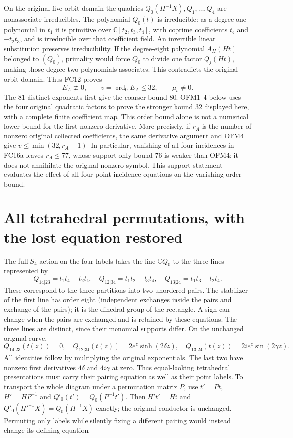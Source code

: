 \documentclass[11pt]{article}
\newcommand{\C}{\mathbb C}
\newcommand{\ord}{\operatorname{ord}}
\begin{document}
On the original five-orbit domain the quadrics $Q_0(H^{-1}X),Q_1,\ldots,Q_4$
are nonassociate irreducibles. The polynomial $Q_0(t)$ is irreducible:
as a degree-one polynomial in $t_1$ it is primitive over
$\C[t_2,t_3,t_4]$, with coprime coefficients $t_4$ and $-t_2t_3$,
and is irreducible over that coefficient field. An invertible linear
substitution preserves irreducibility. If the degree-eight polynomial
$A_H(Ht)$ belonged to $(Q_0)$, primality would force $Q_0$ to divide
one factor $Q_j(Ht)$, making those degree-two polynomials associates.
This contradicts the original orbit domain. Thus FC12 proves
\[
 E_A\not\equiv0,\qquad
 v=\ord_0E_A\le32,\qquad\mu_v\ne0.
 \tag{FC17}
\]
The $81$ distinct exponents first give the coarser bound $80$.
OFM1--4 below uses the four original quadratic factors to prove the
stronger bound $32$ displayed here, with a complete finite coefficient
map. This order bound alone is not a numerical lower bound for the
first nonzero derivative.
More precisely, if $r_A$ is the number of nonzero original collected
coefficients, the same derivative argument and OFM4 give $v\le\min(32,r_A-1)$.
In particular, vanishing of all four incidences in FC16a leaves
$r_A\le77$, whose support-only bound $76$ is weaker than OFM4; it does not annihilate the original
nonzero symbol. This support statement evaluates the effect of all four
point-incidence equations on the vanishing-order bound.

\section{All tetrahedral permutations, with the lost equation restored}
The full $S_4$ action on the four labels takes the line $\C Q_0$ to
the three lines represented by
\[
 Q_{14|23}=t_1t_4-t_2t_3,\quad
 Q_{12|34}=t_1t_2-t_3t_4,\quad
 Q_{13|24}=t_1t_3-t_2t_4.
 \tag{FC18}
\]
These correspond to the three partitions into two unordered pairs.
The stabilizer of the first line has order eight (independent exchanges
inside the pairs and exchange of the pairs); it is the dihedral group
of the rectangle. A sign can change when the pairs are exchanged and
is retained by these equations. The three lines are distinct, since
their monomial supports differ. On the unchanged original curve,
\[
 Q_{14|23}(t(z))=0,\quad
 Q_{12|34}(t(z))=2e^z\sinh(2\delta z),\quad
 Q_{13|24}(t(z))=2ie^z\sin(2\gamma z).
 \tag{FC19}
\]
All identities follow by multiplying the original exponentials. The
last two have nonzero first derivatives $4\delta$ and $4i\gamma$ at zero.
Thus equal-looking tetrahedral presentations must carry their pairing
equation as well as their point labels. To transport the whole diagram
under a permutation matrix $P$, use $t'=Pt$, $H'=HP^{-1}$ and
$Q'_0(t')=Q_0(P^{-1}t')$. Then $H't'=Ht$ and
$Q'_0(H'^{-1}X)=Q_0(H^{-1}X)$ exactly; the original conductor is unchanged.
Permuting only labels while silently fixing a different pairing would
instead change its defining equation.
\end{document}
